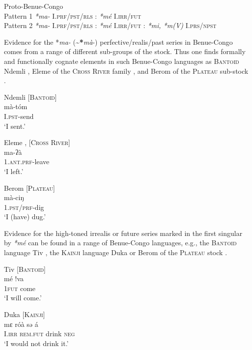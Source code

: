 \documentclass[output=paper]{langsci/langscibook}
\begin{document}
\ea\label{ex:anderson:71}
 Proto-Benue-Congo\\
Pattern 1  \textit{*ma-} I.\textsc{prf/pst/rls  :}  \textit{*mé}  I.\textsc{irr/fut}\\  
Pattern 2  \textit{*ma-} I.\textsc{prf/pst/rls}  :  \textit{*mé} I.\textsc{irr/fut}  :   \textit{*mi, *m(V)} I.\textsc{prs/npst}\\
\z

Evidence for the *\textit{ma-} ({\textasciitilde}\textbf{*}\textit{mà}-) perfective/realis/past series in Benue-Congo  comes from a range of different sub-groups of the stock. Thus one finds formally and functionally cognate elements in such Benue-Congo languages as \textsc{Bantoid} Ndemli , Eleme of the \textsc{Cross River} family , and Berom of the \textsc{Plateau} sub-stock .

\ea\label{ex:anderson:72}
Ndemli   \citep[72]{Ngoran1999}            [\textsc{Bantoid}]\\
\gll mà-tóm \\
\textsc{I.pst-}send\\
\glt  `I sent.'   
\z

\ea\label{ex:anderson:73}
Eleme  \citep[1482]{Bond2008}, \citep{Bond2010}        [\textsc{Cross River]}\\
\gll ma-ʔà\\
1.\textsc{ant.prf}-leave\\
\glt `I left.'
\z

\ea\label{ex:anderson:74}
Berom  \citep[299, 301]{Bouquiaux1970}          [\textsc{Plateau}]\\
\gll mà-ciŋ\\
1.\textsc{pst/prf}-dig\\
\glt `I (have) dug.'
\z

Evidence for the high-toned irrealis or future series marked in the first singular by \textit{*mé} can be found in a range of Benue-Congo languages, e.g., the \textsc{Bantoid} language Tiv , the \textsc{Kainji} language Duka  or Berom of the \textsc{Plateau} stock .

\ea\label{ex:anderson:75}
 Tiv \citep[Tiv 4]{Arnott19671980}        \textsc{[Bantoid]}\\
 \gll mé    !va\\
\textsc{1fut}  come\\
\glt `I will come.'
\z

\ea\label{ex:anderson:76}
Duka \citep[17]{BendorSamuelEtAl1973}      \textsc{[Kainji]}\\
\gll  mɛ    róà    sə  á\\
I.\textsc{irr}  \textsc{rem.fut}  drink  \textsc{neg}\\
\glt `I would not drink it.'
\z
\end{document}
